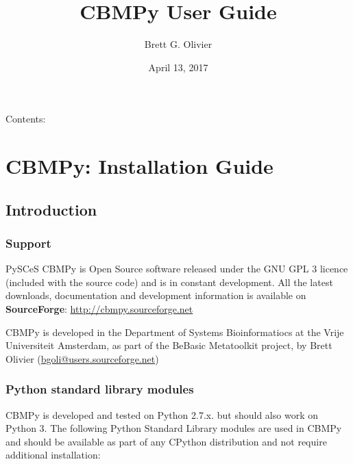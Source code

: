 \documentclass[a4paper,11pt,english]{sphinxmanual}
\title{CBMPy User Guide}
\date{April 13, 2017}
\author{Brett G. Olivier}
\begin{document}
\maketitle
\tableofcontents
{}\label{cbmpy::doc}


Contents:


\chapter{CBMPy: Installation Guide}
\label{install_doc:cbmpy-reference-guide}\label{install_doc::doc}\label{install_doc:cbmpy-installation-guide}

\section{Introduction}
\label{install_doc:introduction}

\subsection{Support}
\label{install_doc:support}
PySCeS CBMPy is Open Source software released under the GNU GPL 3 licence (included with the source code)
and is in constant development. All the latest downloads, documentation and development information
is available on \textbf{SourceForge}: \url{http://cbmpy.sourceforge.net}

CBMPy is developed in the Department of Systems Bioinformatiocs at the Vrije Universiteit Amsterdam, as part
of the BeBasic Metatoolkit project, by Brett Olivier (\href{mailto:bgoli@users.sourceforge.net}{bgoli@users.sourceforge.net})


\subsection{Python standard library modules}
\label{install_doc:python-standard-library-modules}
CBMPy is developed and tested on Python 2.7.x. but should also work on Python 3.
The following Python Standard Library modules are used in CBMPy and should be available as part of any CPython
distribution and not require additional installation:
\end{document}
